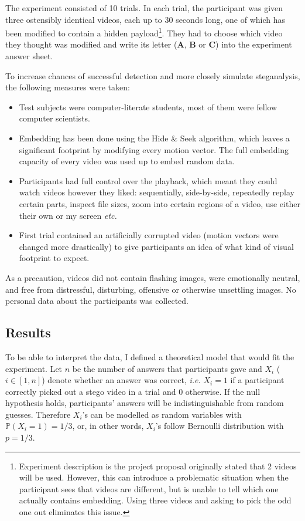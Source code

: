 \documentclass[12pt,british,twoside,notitlepage,usenames,dvipsnames,hypens,final]{report}
\numberwithin{equation}{section}
\numberwithin{figure}{section}
\newcommand{\textsb}[1]{\textsf{\textbf{#1}}}
\begin{document}
The experiment consisted of 10 trials. In each trial, the participant was given three ostensibly identical videos, each up to 30 seconds long, one of which has been modified to contain a hidden payload\footnote{Experiment description is the project proposal originally stated that 2 videos will be used. However, this can introduce a problematic situation when the participant sees that videos are different, but is unable to tell which one actually contains embedding. Using three videos and asking to pick the odd one out eliminates this issue.}. They had to choose which video they thought was modified and write its letter (\textsb{A}, \textsb{B} or \textsb{C}) into the experiment answer sheet.

To increase chances of successful detection and more closely simulate steganalysis, the following measures were taken:
\begin{itemize}
\item Test subjects were computer-literate students, most of them were fellow computer scientists.
\item Embedding has been done using the Hide \& Seek algorithm, which leaves a significant footprint by modifying every motion vector. The full embedding capacity of every video was used up to embed random data.  
\item Participants had full control over the playback, which meant they could watch videos however they liked: sequentially, side-by-side, repeatedly replay certain parts, inspect file sizes, zoom into certain regions of a video, use either their own or my screen \emph{etc.}
\item First trial contained an artificially corrupted video (motion vectors were changed more drastically) to give participants an idea of what kind of visual footprint to expect. 
\end{itemize} 

As a precaution, videos did not contain flashing images, were emotionally neutral, and free from distressful, disturbing, offensive or otherwise unsettling images. No personal data about the participants was collected.

\subsection{Results}

To be able to interpret the data, I defined a theoretical model that would fit the experiment. Let $n$ be the number of answers that participants gave and $X_i$ ($i \in [1, n]$) denote whether an answer was correct, \emph{i.e.} $X_i = 1$ if a participant correctly picked out a stego video in a trial and 0 otherwise. If the null hypothesis holds, participants' answers will be indistinguishable from random guesses. Therefore $X_i$'s can be modelled as random variables with $\mathbb{P}(X_i = 1) = 1/3$, or, in other words, $X_i$'s follow Bernoulli distribution with $p = 1/3$. 
\end{document}
